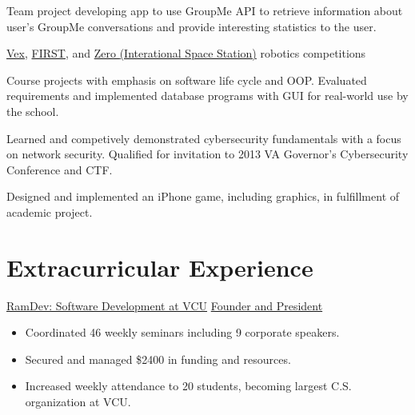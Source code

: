 \documentclass[11pt,letterpaper,serif]{moderncv}
\begin{document}
{
	\begin{adjustwidth}{.25in}{}
		Team project developing app to use GroupMe API to retrieve information about user's GroupMe conversations and provide interesting statistics to the user.
	\end{adjustwidth}
}

{\href{https://www.vexrobotics.com/vexedr/competition}{Vex}, \href{https://www.firstinspires.org/robotics/ftc}{FIRST}, and \href{http://zerorobotics.mit.edu/}{Zero {\footnotesize (Interational Space Station)}} robotics competitions}
{}{}{}

{
	\begin{adjustwidth}{.25in}{}
		Course projects with emphasis on software life cycle and OOP. Evaluated requirements and implemented database programs with GUI for real-world use by the school.
	\end{adjustwidth}
}

{
	\begin{adjustwidth}{.25in}{}
		Learned and competively demonstrated cybersecurity fundamentals with a focus on network security. \newline
		Qualified for invitation to 2013 VA Governor's Cybersecurity Conference and CTF.
	\end{adjustwidth}
}

{
	\begin{adjustwidth}{.25in}{}
		Designed and implemented an iPhone game, including graphics, in fulfillment of academic project.
	\end{adjustwidth}
}


\section{Extracurricular Experience}
{\href{https://vcuramdev.github.io/}{RamDev: Software Development at VCU}}
{\href{https://vcuramdev.github.io/}{Founder and President}}
{}{}
{
	\begin{adjustwidth}{.25in}{}
		\begin{itemize}
			\item Coordinated 46 weekly seminars including 9 corporate speakers.
			\item Secured and managed \$2400 in funding and resources.
			\item Increased weekly attendance to 20 students, becoming largest C.S. organization at VCU.
		\end{itemize}
	\end{adjustwidth}
}
\end{document}
